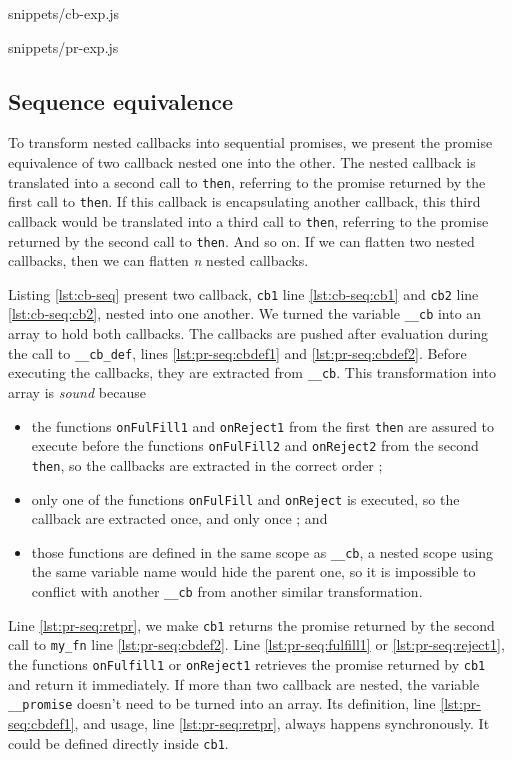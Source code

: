              {snippets/cb-exp.js}

             {snippets/pr-exp.js}


\subsection{Sequence equivalence} \label{section:sequence}

To transform nested callbacks into sequential promises, we present the promise equivalence of two callback nested one into the other.
The nested callback is translated into a second call to \texttt{then}, referring to the promise returned by the first call to \texttt{then}.
If this callback is encapsulating another callback, this third callback would be translated into a third call to \texttt{then}, referring to the promise returned by the second call to \texttt{then}.
And so on.
If we can flatten two nested callbacks, then we can flatten \textit{n} nested callbacks.

Listing \ref{lst:cb-seq} present two callback, \texttt{cb1} line \ref{lst:cb-seq:cb1} and \texttt{cb2} line \ref{lst:cb-seq:cb2}, nested into one another.
We turned the variable \texttt{__cb} into an array to hold both callbacks.
The callbacks are pushed after evaluation during the call to \texttt{__cb_def}, lines \ref{lst:pr-seq:cbdef1} and \ref{lst:pr-seq:cbdef2}.
Before executing the callbacks, they are extracted from \texttt{__cb}.
This transformation into array is \textit{sound} because
\begin{itemize}
\item the functions \texttt{onFulFill1} and \texttt{onReject1} from the first \texttt{then} are assured to execute before the functions \texttt{onFulFill2} and \texttt{onReject2} from the second \texttt{then}, so the callbacks are extracted in the correct order ;
\item only one of the functions \texttt{onFulFill} and \texttt{onReject} is executed, so the callback are extracted once, and only once ; and
\item those functions are defined in the same scope as \texttt{__cb}, a nested scope using the same variable name would hide the parent one, so it is impossible to conflict with another \texttt{__cb} from another similar transformation.
\end{itemize}
Line \ref{lst:pr-seq:retpr}, we make \texttt{cb1} returns the promise returned by the second call to \texttt{my_fn} line \ref{lst:pr-seq:cbdef2}.
Line \ref{lst:pr-seq:fulfill1} or \ref{lst:pr-seq:reject1}, the functions \texttt{onFulfill1} or \texttt{onReject1} retrieves the promise returned by \texttt{cb1} and return it immediately.
If more than two callback are nested, the variable \texttt{__promise} doesn't need to be turned into an array.
Its definition, line \ref{lst:pr-seq:cbdef1}, and usage, line \ref{lst:pr-seq:retpr}, always happens synchronously.
It could be defined directly inside \texttt{cb1}.

